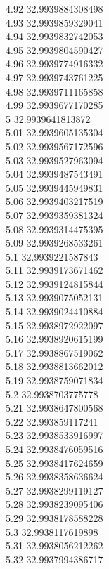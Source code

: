 {4.92	32.9939884308498\\
4.93	32.9939859329041\\
4.94	32.9939832742053\\
4.95	32.9939804590427\\
4.96	32.9939774916332\\
4.97	32.9939743761225\\
4.98	32.9939711165858\\
4.99	32.9939677170285\\
5	32.9939641813872\\
5.01	32.9939605135304\\
5.02	32.9939567172596\\
5.03	32.9939527963094\\
5.04	32.9939487543491\\
5.05	32.9939445949831\\
5.06	32.9939403217519\\
5.07	32.9939359381324\\
5.08	32.9939314475395\\
5.09	32.9939268533261\\
5.1	32.9939221587843\\
5.11	32.9939173671462\\
5.12	32.9939124815844\\
5.13	32.9939075052131\\
5.14	32.9939024410884\\
5.15	32.9938972922097\\
5.16	32.9938920615199\\
5.17	32.9938867519062\\
5.18	32.9938813662012\\
5.19	32.9938759071834\\
5.2	32.9938703775778\\
5.21	32.9938647800568\\
5.22	32.993859117241\\
5.23	32.9938533916997\\
5.24	32.9938476059516\\
5.25	32.9938417624659\\
5.26	32.9938358636624\\
5.27	32.9938299119127\\
5.28	32.9938239095406\\
5.29	32.9938178588228\\
5.3	32.9938117619898\\
5.31	32.9938056212262\\
5.32	32.9937994386717\\
}
